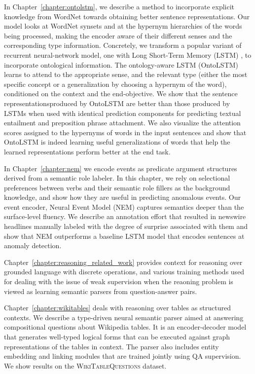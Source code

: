 In Chapter~\ref{chapter:ontolstm}, we describe a method to incorporate explicit knowledge from
WordNet towards obtaining better sentence representations. Our model looks at WordNet synsets and at
the hypernym hierarchies of the words being processed, making the encoder aware of their different
senses and the corresponding type information. Concretely, we transform a popular variant of
recurrent neural-network model, one with Long Short-Term Memory (LSTM) \citep{hochreiter1997long},
to incorporate ontological information.  The ontology-aware LSTM (OntoLSTM) learns to attend to the
appropriate sense, and the relevant type (either the most specific concept or a generalization by
choosing a hypernym of the word), conditioned on the context and the end-objective. We show that the
sentence representationsproduced by OntoLSTM are better than those produced by LSTMs when used with
identical prediction components for predicting textual entailment and preposition phrase attachment.
We also visualize the attention scores assigned to the hypernyms of words in the input sentences and
show that OntoLSTM is indeed learning useful generalizations of words that help the learned
representations perform better at the end task.

In Chapter~\ref{chapter:nem} we encode events as predicate argument structures derived from a
semantic role labeler.  In this chapter, we rely on selectional preferences between verbs and their
semantic role fillers as the background knowledge, and show how they are useful in predicting
anomalous events.  Our event encoder, Neural Event Model (NEM) captures semantics deeper than the
surface-level fluency. We describe an annotation effort that resulted in newswire headlines manually
labeled with the degree of surprise associated with them and show that NEM outperforms a baseline
LSTM model that encodes sentences at anomaly detection. 

Chapter~\ref{chapter:reasoning_related_work} provides context for reasoning over grounded language
with discrete operations, and various training methods used for dealing with the issue of weak
supervision when the reaoning problem is viewed as learning semantic parsers from question-answer
pairs.

Chapter~\ref{chapter:wikitables} deals with reasoning over tables as structured contexts. We
describe a type-driven neural semantic parser aimed at answering compositional questions about
Wikipedia tables. It is an encoder-decoder model that generates well-typed logical forms that can be
executed against graph representations of the tables in context. The parser also includes entity
embedding and linking modules that are trained jointly using QA supervision. We show results on 
the \textsc{WikiTableQuestions} dataset.

